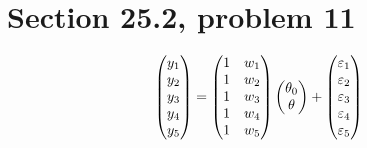 \section{Section 25.2, problem 11}
$$\left(\begin{matrix}
y_1\cr
y_2\cr
y_3\cr
y_4\cr
y_5\cr
\end{matrix}\right)=\left(\begin{matrix}
1 & w_1\cr
1 & w_2\cr
1 & w_3\cr
1 & w_4\cr
1 & w_5
\end{matrix}\right)\left(\begin{matrix}
\theta_0\cr
\theta\cr
\end{matrix}\right)+\left(\begin{matrix}
\varepsilon_1\cr
\varepsilon_2\cr
\varepsilon_3\cr
\varepsilon_4\cr
\varepsilon_5
\end{matrix}\right)
$$

